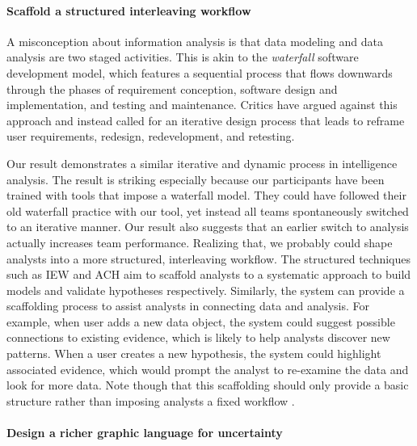 \paragraph{Scaffold a structured interleaving workflow}

A misconception about information analysis is that data modeling and
data analysis are two staged activities. This is akin to the \emph{waterfall}
software development model, which features a sequential process that
flows downwards through the phases of requirement conception, software
design and implementation, and testing and maintenance. Critics have
argued against this approach and instead called for an iterative design
process that leads to reframe user requirements,
redesign, redevelopment, and retesting.

Our result demonstrates a similar iterative and dynamic process in intelligence
analysis. The result is striking especially because our participants have been
trained with tools that impose a waterfall model. They could have followed their
old waterfall practice with our tool, yet instead all teams spontaneously
switched to an iterative manner. Our result also suggests that an earlier switch
to analysis actually increases team performance. Realizing that, we probably
could shape analysts into a more structured, interleaving workflow. The structured techniques such as IEW and ACH aim to scaffold analysts to a systematic approach to build models and validate hypotheses respectively. Similarly, the system can provide a scaffolding process to assist analysts in connecting data and analysis. For example, when user adds a new data object, the system could
suggest possible connections to existing evidence, which is likely to help analysts discover new patterns. When a user creates a new hypothesis, the system could highlight associated evidence, which would prompt the analyst to re-examine the data and look for more data. Note though that this scaffolding should only provide a basic structure rather than imposing analysts a fixed workflow \cite{Kang2011}.


\paragraph{Design a richer graphic language for uncertainty}

